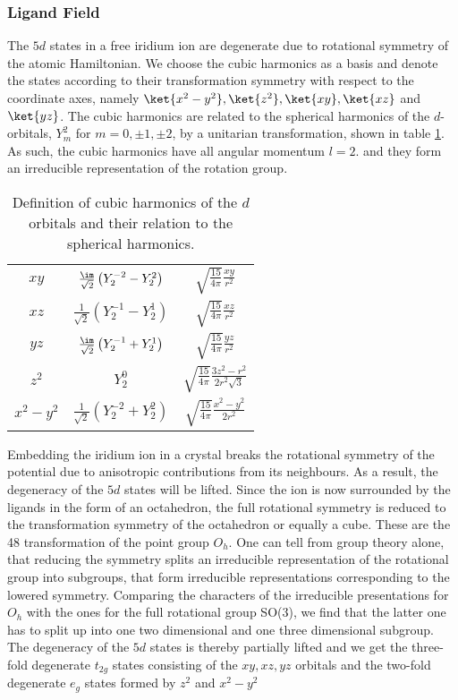 \subsubsection{Ligand Field}

The $5d$ states  in a free iridium ion are degenerate due to rotational symmetry of the atomic Hamiltonian. 
We choose the cubic harmonics as a basis and  denote the states  according to their transformation symmetry with respect to the coordinate axes, namely 
$\ket{x^2-y^2},\ket{z^2},\ket{xy},\ket{xz}$ and $\ket{yz}$.
The cubic harmonics are related to the spherical harmonics  of the $d$-orbitals, $Y^2_m$ for $m=0,\pm1,\pm2$, by a unitarian transformation, shown in table \ref{sphericHarmonics}.
As such, the cubic harmonics have all angular momentum $l=2$. 
and they form an irreducible representation of the rotation group.
\begin{table}
\begin{center}
\begin{tabular}{|c|c|c|}
 \hline
 $xy$ & $\frac{\im}{\sqrt 2} \left( Y^{-2}_2 - Y^2_2 \right)$ & $\sqrt{\frac{15}{4\pi}} \frac{xy}{r^2}$ \\
 $xz$ & $\frac{  1}{\sqrt 2} \left( Y^{-1}_2 - Y^1_2 \right)$ & $\sqrt{\frac{15}{4\pi}} \frac{xz}{r^2}$ \\
 $yz$ & $\frac{\im}{\sqrt 2} \left( Y^{-1}_2 + Y^1_2 \right)$ & $\sqrt{\frac{15}{4\pi}} \frac{yz}{r^2}$ \\
 $z^2$& $ Y^0_{2} 					      $	& $\sqrt{\frac{15}{4\pi}} \frac{3z^2-r^2}{2r^2\sqrt 3} $\\
 $x^2-y^2$&$\frac1{\sqrt 2} \left( Y^{-2}_2 + Y^2_2 \right) $ & $\sqrt{\frac{15}{4\pi}} \frac{x^2-y^2}{2r^2} $ \\
 \hline
\end{tabular}
\caption{Definition of cubic harmonics of the $d$ orbitals and their relation to the spherical harmonics.}
\label{sphericHarmonics}
\end{center}
\end{table}
%

Embedding the iridium ion in a crystal breaks the rotational symmetry of the potential due to anisotropic contributions from its neighbours.
As a result, the degeneracy of the $5d$ states will be lifted. 
Since the ion is now surrounded by the ligands in the form of an octahedron, the 
full rotational symmetry is reduced to the transformation symmetry of the octahedron or equally a cube. 
These are the 48 transformation of the point group $O_h$.
One can tell from group theory alone, that reducing the symmetry splits an irreducible representation of the rotational group into subgroups, that form irreducible representations 
corresponding to the lowered symmetry. 
Comparing the characters of the irreducible presentations for $O_h$ with the ones for the full rotational group SO(3), we find that 
the latter one has to split up into one  two dimensional and one three dimensional subgroup. 
The degeneracy of the $5d$ states is thereby partially lifted and we get the 
three-fold degenerate $t_{2g}$ states consisting of the $xy,xz,yz$ orbitals and the two-fold degenerate $e_g$ states formed by $z^2$ and $x^2-y^2$ \cite[Chapter~4]{Tinkham64} 

